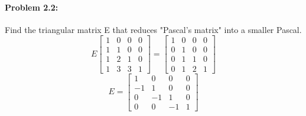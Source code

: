 \documentclass {article}
\begin{document}
\paragraph {Problem 2.2:}
Find the triangular matrix E that reduces "Pascal's matrix" into a smaller Pascal.
$$
E
\begin{bmatrix}
  1 & 0 & 0 & 0 \\
  1 & 1 & 0 & 0  \\
  1 & 2 & 1 & 0  \\
  1 & 3 & 3 & 1
\end{bmatrix}
=
\begin{bmatrix}
  1 & 0 & 0 & 0 \\
  0 & 1 & 0 & 0  \\
  0 & 1 & 1 & 0  \\
  0 & 1 & 2 & 1
\end{bmatrix}
$$
$$
E = 
\begin{bmatrix}
  1 & 0 & 0 & 0 \\
  -1 & 1 & 0 & 0  \\
  0 & -1 & 1 & 0  \\
  0 & 0 & -1 & 1
\end{bmatrix}
$$
\end{document}
